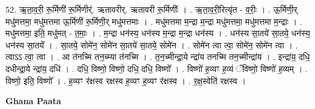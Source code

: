 \documentclass[17pt]{extarticle}
\begin{document}
52. ऋ॒ता॒व॒री॒ रू॒र्मिणी॑ रू॒र्मिणीर्॑. ऋतावरीर्. ऋतावरी रू॒र्मिणीः᳚ । . ऋ॒ता॒व॒री॒रित्यृ॑त - व॒रीः॒ । . ऊ॒र्मिणी॒र् मधु॑मत्तमा॒ मधु॑मत्तमा ऊ॒र्मिणी॑ रू॒र्मिणी॒र् मधु॑मत्तमाः । . मधु॑मत्तमा म॒न्द्रा म॒न्द्रा मधु॑मत्तमा॒ मधु॑मत्तमा म॒न्द्राः । . मधु॑मत्तमा॒ इति॒ मधु॑मत् - त॒माः॒ । . म॒न्द्रा धन॑स्य॒ धन॑स्य म॒न्द्रा म॒न्द्रा धन॑स्य । . धन॑स्य सा॒तये॑ सा॒तये॒ धन॑स्य॒ धन॑स्य सा॒तये᳚ । . सा॒तये॒ सोमे॑न॒ सोमे॑न सा॒तये॑ सा॒तये॒ सोमे॑न । . सोमे॑न त्वा त्वा॒ सोमे॑न॒ सोमे॑न त्वा । . त्वाऽऽ त्वा॒ त्वा । . आ त॑नच्मि तन॒च्म्या त॑नच्मि । . त॒न॒च्मीन्द्रा॒ये न्द्रा॑य तनच्मि तन॒च्मीन्द्रा॑य । . इन्द्रा॑य॒ दधि॒ दधीन्द्रा॒ये न्द्रा॑य॒ दधि॑ । . दधि॒ विष्णो॒ विष्णो॒ दधि॒ दधि॒ विष्णो᳚ । . विष्णो॑ ह॒व्यꣳ ह॒व्यं ॅविष्णो॒ विष्णो॑ ह॒व्यम् । . विष्णो॒ इति॒ विष्णो᳚ । . ह॒व्यꣳ र॑क्षस्व रक्षस्व ह॒व्यꣳ ह॒व्यꣳ र॑क्षस्व । . र॒क्ष॒स्वेति॑ रक्षस्व । \newline

\textbf{Ghana Paata } \newline
\end{document}
